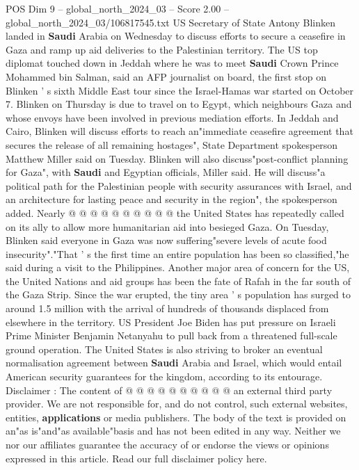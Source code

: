 \begin{textsample}{POS Dim 9 – global\_north\_2024\_03 – Score 2.00 – global\_north\_2024\_03/106817545.txt}  \label{ex:f9_pos_201}
US Secretary of State Antony Blinken landed in \textbf{Saudi} Arabia on Wednesday to discuss efforts to secure a ceasefire in Gaza and ramp up aid deliveries to the Palestinian territory.
The US top diplomat touched down in Jeddah where he was to meet \textbf{Saudi} Crown Prince Mohammed bin Salman, said an AFP journalist on board, the first stop on Blinken ' s sixth Middle East tour since the Israel-Hamas war started on October 7.
Blinken on Thursday is due to travel on to Egypt, which neighbours Gaza and whose envoys have been involved in previous mediation efforts.
In Jeddah and Cairo, Blinken will discuss efforts to reach an"immediate ceasefire agreement that secures the release of all remaining hostages", State Department spokesperson Matthew Miller said on Tuesday.
Blinken will also discuss"post-conflict planning for Gaza", with \textbf{Saudi} and Egyptian officials, Miller said.
He will discuss"a political path for the Palestinian people with security assurances with Israel, and an architecture for lasting peace and security in the region", the spokesperson added.
Nearly @ @ @ @ @ @ @ @ @ @ the United States has repeatedly called on its ally to allow more humanitarian aid into besieged Gaza.
On Tuesday, Blinken said everyone in Gaza was now suffering"severe levels of acute food insecurity"."That ' s the first time an entire population has been so classified,"he said during a visit to the Philippines.
Another major area of concern for the US, the United Nations and aid groups has been the fate of Rafah in the far south of the Gaza Strip.
Since the war erupted, the tiny area ' s population has surged to around 1.5 million with the arrival of hundreds of thousands displaced from elsewhere in the territory.
US President Joe Biden has put pressure on Israeli Prime Minister Benjamin Netanyahu to pull back from a threatened full-scale ground operation.
The United States is also striving to broker an eventual normalisation agreement between \textbf{Saudi} Arabia and Israel, which would entail American security guarantees for the kingdom, according to its entourage.
Disclaimer : The content of @ @ @ @ @ @ @ @ @ @ an external third party provider.
We are not responsible for, and do not control, such external websites, entities, \textbf{applications} or media publishers.
The body of the text is provided on an"as is"and"as available"basis and has not been edited in any way.
Neither we nor our affiliates guarantee the accuracy of or endorse the views or opinions expressed in this article.
Read our full disclaimer policy here.

\end{textsample}
